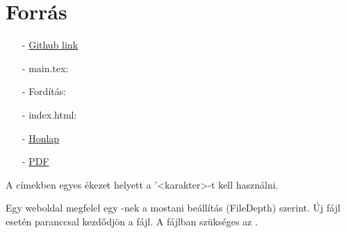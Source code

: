 \chapter{Forr\'as}

\begin{enumerate}
    \item[-] \href{https://github.com/a-gondolkodas-orome/latex-tutorial}{Github link} 
    \item[-] main.tex: 
    \item[-] Fordítás:  
    \item[-] index.html:  
    \item[-] \href{https://a-gondolkodas-orome.github.io/latex-tutorial/index.html}{Honlap}
    \item[-] \href{https://a-gondolkodas-orome.github.io/latex-tutorial/mainpage.pdf}{PDF}
\end{enumerate}
        
A címekben egyes ékezet helyett a  '<karakter>-t kell használni. 

Egy weboldal megfelel egy \code{\chapter}-nek a mostani beállítás (FileDepth) szerint. Új fájl esetén  paranccsal kezdődjön a fájl. A  fájlban szükséges az \code{}.

